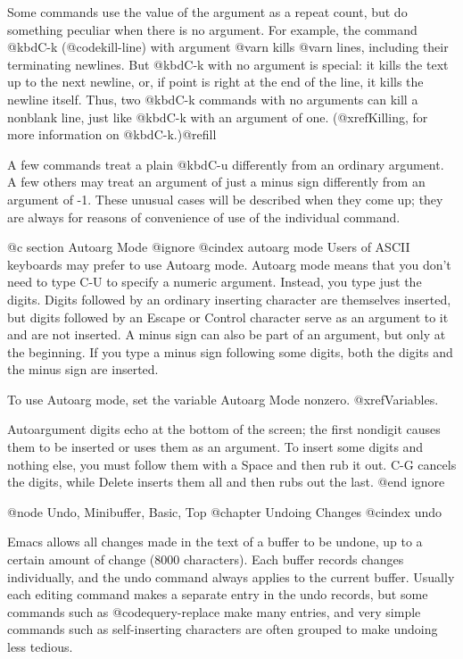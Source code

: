 {{{{{  Some commands use the value of the argument as a repeat count, but do
something peculiar when there is no argument.  For example, the command
@kbd{C-k} (@code{kill-line}) with argument @var{n} kills @var{n} lines,
including their terminating newlines.  But @kbd{C-k} with no argument is
special: it kills the text up to the next newline, or, if point is right at
the end of the line, it kills the newline itself.  Thus, two @kbd{C-k}
commands with no arguments can kill a nonblank line, just like @kbd{C-k}
with an argument of one.  (@xref{Killing}, for more information on
@kbd{C-k}.)@refill

  A few commands treat a plain @kbd{C-u} differently from an ordinary
argument.  A few others may treat an argument of just a minus sign
differently from an argument of -1.  These unusual cases will be described
when they come up; they are always for reasons of convenience of use of the
individual command.

@c section Autoarg Mode
@ignore
@cindex autoarg mode
  Users of ASCII keyboards may prefer to use Autoarg mode.  Autoarg mode
means that you don't need to type C-U to specify a numeric argument.
Instead, you type just the digits.  Digits followed by an ordinary
inserting character are themselves inserted, but digits followed by an
Escape or Control character serve as an argument to it and are not
inserted.  A minus sign can also be part of an argument, but only at the
beginning.  If you type a minus sign following some digits, both the digits
and the minus sign are inserted.

  To use Autoarg mode, set the variable Autoarg Mode nonzero.
@xref{Variables}.

  Autoargument digits echo at the bottom of the screen; the first nondigit
causes them to be inserted or uses them as an argument.  To insert some
digits and nothing else, you must follow them with a Space and then rub it
out.  C-G cancels the digits, while Delete inserts them all and then rubs
out the last.
@end ignore

@node Undo, Minibuffer, Basic, Top
@chapter Undoing Changes
@cindex undo

  Emacs allows all changes made in the text of a buffer to be undone,
up to a certain amount of change (8000 characters).  Each buffer records
changes individually, and the undo command always applies to the
current buffer.  Usually each editing command makes a separate entry
in the undo records, but some commands such as @code{query-replace}
make many entries, and very simple commands such as self-inserting
characters are often grouped to make undoing less tedious.

}}}}}
